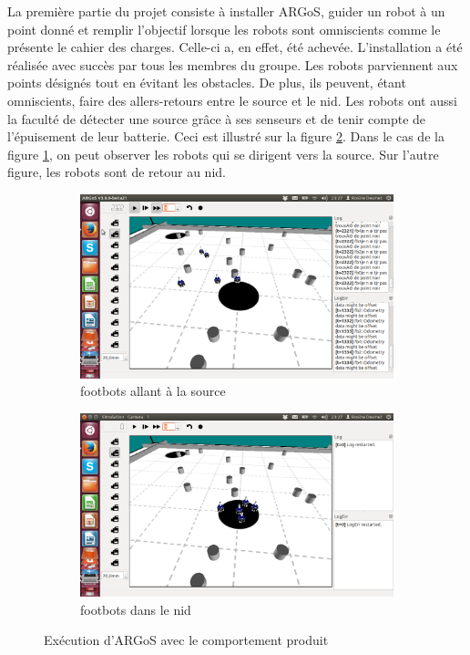 \documentclass[a4paper,11pt]{report}
\begin{document}
La première partie du projet consiste à installer ARGoS, guider un robot à un point donné et remplir l'objectif lorsque les robots sont omniscients comme le présente le cahier des charges.\cite{cahierCharges} Celle-ci a, en effet, été achevée. L'installation a été réalisée avec succès par tous les membres du groupe. Les robots parviennent aux points désignés tout en évitant les obstacles. De plus, ils peuvent, étant omniscients, faire des allers-retours entre le source et le nid. Les robots ont aussi la faculté de détecter une source grâce à ses senseurs et de tenir compte de l'épuisement de leur batterie. Ceci est illustré sur la figure \ref{fig:ourArgos}. Dans le cas de la figure \ref{fig:argosNest}, on  peut observer les robots qui se dirigent vers la source. Sur l'autre figure, les robots sont  de retour au nid.

\begin{figure}[h!]
        \centering
        \begin{subfigure}[h!]{0.4\textwidth}
                \includegraphics[trim = 60mm 40mm 75mm 45mm, clip, width=\textwidth]{ourArgos1.png}
                \caption{footbots allant à la source}
        \end{subfigure}   \begin{subfigure}[h!]{0.4\textwidth}
                \includegraphics[trim = 60mm 40mm 75mm 45mm, clip, width=\textwidth]{ourArgos2.png}
                \caption{footbots dans le nid\label{fig:argosNest}}
        \end{subfigure}
        \caption{Exécution d'ARGoS avec le comportement produit\label{fig:ourArgos}}
\end{figure}
\end{document}
